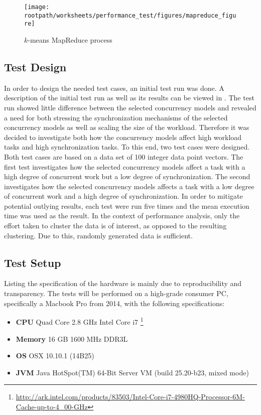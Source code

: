 \begin{figure}
\centering
\texttt{[image: \\rootpath/worksheets/performance\_test/figures/mapreduce\_figure]}
\caption{$k$-means MapReduce process}\label{fig:kmeans_mapreduce}
\end{figure}



\subsection{Test Design}
In order to design the needed test cases, an initial test run was done. A description of the initial test run as well as its results can be viewed in . The test run showed little difference between the selected concurrency models and revealed a need for both stressing the synchronization mechanisms of the selected concurrency models as well as scaling the size of the workload. Therefore it was decided to investigate both how the concurrency models affect high workload tasks and high synchronization tasks. To this end, two test cases were designed. Both test cases are based on a data set of 100 integer data point vectors. The first test investigates how the selected concurrency models affect a task with a high degree of concurrent work but a low degree of synchronization. The second investigates how the selected concurrency models affects a task with a low degree of concurrent work and a high degree of synchronization. In order to mitigate potential outlying results, each test were run five times and the mean execution time was used as the result. In the context of performance analysis, only the effort taken to cluster the data is of interest, as opposed to the resulting clustering. Due to this, randomly generated data is sufficient.


\subsection{Test Setup}\label{subsec:hardware}
Listing the specification of the hardware is mainly due to reproducibility and transparency. The tests will be performed on a high-grade consumer PC, specifically a Macbook Pro from 2014, with the following specifications:
\begin{itemize}
	\item \textbf{CPU} Quad Core 2.8 GHz Intel Core i7 \footnote{\url{http://ark.intel.com/products/83503/Intel-Core-i7-4980HQ-Processor-6M-Cache-up-to-4_00-GHz}}
	\item \textbf{Memory} 16 GB 1600 MHz DDR3L
	\item \textbf{\ac{OS}} OSX 10.10.1 (14B25)
	\item \textbf{\ac{JVM}} Java HotSpot(TM) 64-Bit Server VM (build 25.20-b23, mixed mode)
\end{itemize}

